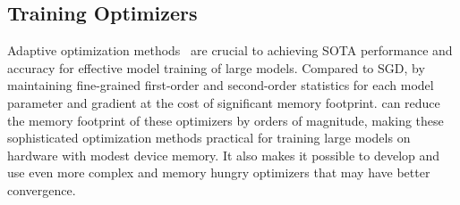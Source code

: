 \subsection{Training Optimizers }
Adaptive optimization methods~\cite{10.5555/Adagrad,DBLP:journals/corr/Adam,DBLP:journals/corr/You-LARS,DBLP:journals/corr/You-LAMB} are crucial to achieving SOTA performance and accuracy for effective model training of large models.  Compared to SGD, by maintaining fine-grained first-order and second-order statistics for each model parameter and gradient at the cost of significant memory footprint. \name can reduce the memory footprint of these optimizers by orders of magnitude, making these sophisticated optimization methods practical for training large models on hardware with modest device memory. It also makes it possible to develop and use even more complex and memory hungry optimizers that may have better convergence.  


\begin{comment}
Furthermore, \name may have major implication in the development of future optimizers. 


Limited GPU memory is a big motivation 


In contrast, \name{} avoids re-materialization overheads by using aggregate memory on distributed hardware to partition model state. 
\name{} intersects with three directions of work in the general area of large-scale training for deep learning models. 

First, \name{} is related to the use of parallelism, namely data parallelism and model parallelism~\cite{narayanan2019pipedream,DBLP:journals/corr/mesh-tensor,megatronlm}, to scale deep learning to larger models (e.g., with billions of parameters), and larger data sets (e.g., with trillions of examples). \name{} addresses a key limitation of data parallelism by making it possible to train models (and/or batch sizes) that are otherwise too larger to fit into the memory of each compute unit (e.g., GPU or CPU). \name{} eliminates this limitation of data parallelism without incurring the performance and code restructuring overheads of model parallelism. Moreover, \name{} can be combined with model parallelism to train even larger models on a given hardware budget. 

Second, \name{} is related to adaptive optimization methods~\cite{10.5555/Adagrad,DBLP:journals/corr/Adam,DBLP:journals/corr/You-LARS,DBLP:journals/corr/You-LAMB}, which are crucial to achieving state-of-the-art performance for effective large-batch training of large models. These methods achieve superior model performance, compared to SGD, by maintaining fine-grained first-order and second-order statistics for each model parameter and gradient at the cost of significant memory footprint. \name{}'s memory saving techniques makes these sophisticated optimization methods practical for training large models on hardware with modest memory capacity. 

Third, 

\end{comment}